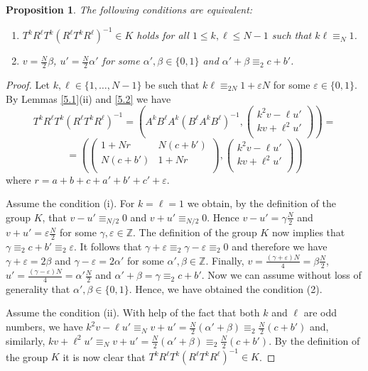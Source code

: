 \documentclass[10pt]{amsart}
\theoremstyle{plain}
\newtheorem{proposition}[theorem]{Proposition}
\theoremstyle{definition}
\theoremstyle{remark}%
\newcommand{\Z}{\mathbb{Z}}
\newcommand{\mat}[4]{\left(\begin{array}{cc}
 #1 & #2\\
 #3 & #4\\
\end{array}\right)}
\newcommand{\vc}[2]{\left(\begin{array}{c}
 #1 \\
 #2\\
\end{array}\right)}
\begin{document}
\begin{proposition}\label{5.3}
The following conditions are equivalent:
\begin{enumerate}
\item[(i)] $T^k R^{\ell}T^k(R^{\ell}T^k R^{\ell})^{-1}\in K$ holds for all $1\leq k,\ell\leq N-1$  such that $k\ell\equiv_N 1$.   
\item[(ii)] $v=\frac{N}{2}\beta$, $u'=\frac{N}{2}\alpha'$ for some $\alpha',\beta\in\{0,1\}$ and $\alpha'+\beta\equiv_2 c+b'$.
\end{enumerate}
\end{proposition}
\begin{proof}
Let $k,\ell\in\{1,\dots,N-1\}$  be such that $k\ell\equiv_{2N}1+\varepsilon N$ for some $\varepsilon\in\{0,1\}$.
By  Lemmas \ref{5.1}(ii) and \ref{5.2}  we have
$$T^k R^\ell T^k\left(R^\ell T^k R^\ell\right)^{-1}=\left(A^k B^{\ell}A^k(B^{\ell} A^k B^{\ell})^{-1}, 
\vc{k^2v-\ell u'}{kv+\ell^2 u'}\right)=$$
$$=\left(
 \mat{1+Nr}{N(c+b')}{N(c+b')}{1+Nr},\vc{k^2v-\ell u'}{kv+\ell^2 u'}\right)$$
 where $r=a+b+c+a'+b'+c'+\varepsilon$.

Assume the condition (i). For $k=\ell=1$ we obtain, by the definition of the group $K$, that $v-u'\equiv_{N/2}0$ and $v+u'\equiv_{N/2}0$. Hence $v-u'=\gamma\frac{N}{2}$ and $v+u'=\varepsilon\frac{N}{2}$ for some $\gamma, \varepsilon\in\Z$. The definition of the group $K$ now implies that $\gamma\equiv_2 c+b'\equiv_2\varepsilon$. It follows that $\gamma+\varepsilon\equiv_2 \gamma-\varepsilon\equiv_2 0$ and therefore we have $\gamma+\varepsilon=2\beta$ and  $\gamma-\varepsilon=2\alpha'$ for some $\alpha',\beta\in\Z$. Finally, $v=\frac{(\gamma+\varepsilon)N}{4}=\beta\frac{N}{2}$, $u'=\frac{(\gamma-\varepsilon)N}{4}=\alpha'\frac{N}{2}$  and $\alpha'+\beta=\gamma\equiv_2 c+b'$. Now we can assume without loss of generality that $\alpha',\beta\in\{0,1\}$. Hence, we have obtained the condition (2).

Assume the condition (ii). With help of the fact that both $k$ and $\ell$ are odd numbers, we have $k^2v-\ell u'\equiv_{N}v+u'=\frac{N}{2}(\alpha'+\beta)\equiv_{2}\frac{N}{2}(c+b')$ and, similarly, $kv+\ell^2 u'\equiv_{N}v+u'=\frac{N}{2}(\alpha'+\beta)\equiv_{2}\frac{N}{2}(c+b')$. By the definition of the group $K$ it is now clear that 
$T^k R^\ell T^k\left(R^\ell T^k R^\ell\right)^{-1}\in K$.
\end{proof}
\end{document}
